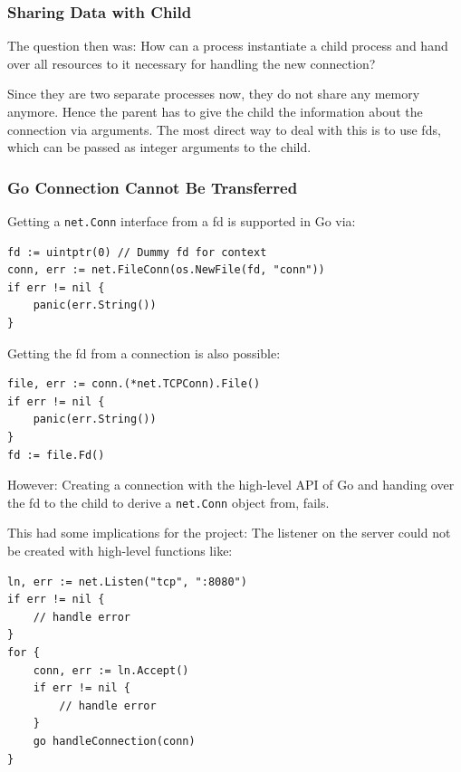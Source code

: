 \documentclass[10pt,a4paper,titlepage,twoside,english,final]{zhawreprt}
\begin{document}
\subsubsection{Sharing Data with Child}\label{sssec:SharingDataWithChild}
The question then was:
How can a process instantiate a child process and hand over all resources to it necessary for handling the new connection?

Since they are two separate processes now, they do not share any memory anymore.
Hence the parent has to give the child the information about the connection via arguments.
The most direct way to deal with this is to use \glspl{fd}, which can be passed as integer arguments to the child.

\subsubsection{Go Connection Cannot Be Transferred}\label{sssec:GoConnectionCannotBeTransferred}
Getting a \texttt{net.Conn} interface from a \gls{fd} is supported in \gls{Go} via:
\setlistingGo
\begin{lstlisting}[caption={Getting a \texttt{net.Conn} interface from a \gls{fd}},label=lst:ConnFromFD]
fd := uintptr(0) // Dummy fd for context
conn, err := net.FileConn(os.NewFile(fd, "conn"))
if err != nil {
	panic(err.String())
}
\end{lstlisting}

Getting the \gls{fd} from a connection is also possible:
\setlistingGo
\begin{lstlisting}[caption={Getting the \gls{fd} from a \texttt{net.Conn} object},label=lst:FDFromConn]
file, err := conn.(*net.TCPConn).File()
if err != nil {
	panic(err.String())
}
fd := file.Fd()
\end{lstlisting}

However: Creating a connection with the high-level \gls{API} of \gls{Go} and handing over the \gls{fd} to the child to derive a \texttt{net.Conn} object from, fails.

This had some implications for the project:
The listener on the server could not be created with high-level functions like:
\setlistingGo
\begin{lstlisting}[caption={\gls{Go}'s high level \gls{API} for listener},label=lst:ListenForConn]
ln, err := net.Listen("tcp", ":8080")
if err != nil {
	// handle error
}
for {
	conn, err := ln.Accept()
	if err != nil {
		// handle error
	}
	go handleConnection(conn)
}
\end{lstlisting}
\end{document}
